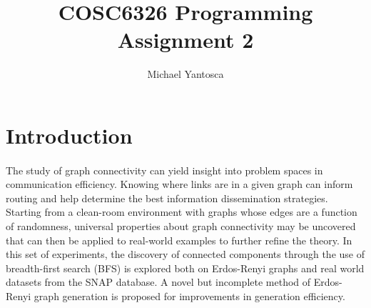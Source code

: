 \documentclass[11pt,epsf]{article}
\date{}
\title{COSC6326 Programming Assignment 2}
\author{Michael Yantosca}
\begin{document}
\maketitle
\tableofcontents

\section{Introduction}{
  \paragraph{}{
    The study of graph connectivity can yield insight into problem spaces in communication
    efficiency. Knowing where links are in a given graph can inform routing and help determine
    the best information dissemination strategies. Starting from a clean-room environment with
    graphs whose edges are a function of randomness, universal properties about
    graph connectivity may be uncovered that can then be applied to real-world examples
    to further refine the theory. In this set of experiments, the discovery of
    connected components through the use of breadth-first search (BFS) is explored both
    on Erdos-Renyi graphs\autocite[5]{pa2spec} and real world datasets from the SNAP database\autocite{SNAP}. A novel
    but incomplete method of Erdos-Renyi graph generation is proposed for improvements in
    generation efficiency.
  }
}
\end{document}
